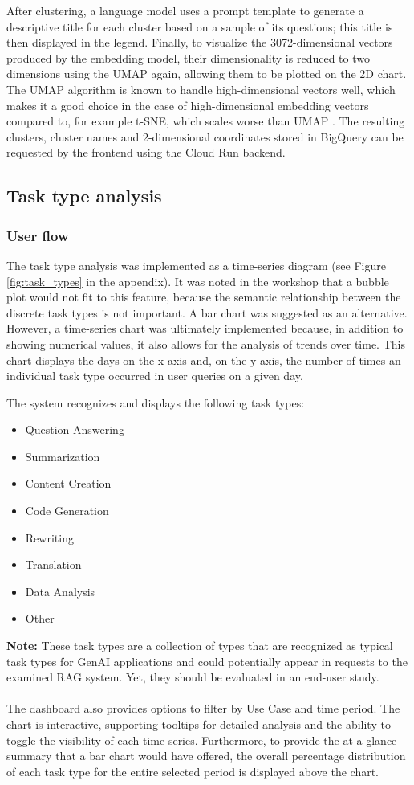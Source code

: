 \documentclass[
	english,
	ruledheaders=section,%
	class=report,%
	thesis={type=bachelor},%
	accentcolor=1b,%
	custommargins=true,%
	marginpar=false,%
	parskip=half-,%
	fontsize=11pt,%
	DIV=14,
]{tudapub}
\begin{document}
After clustering, a language model uses a prompt template to generate a descriptive title for each cluster based on a sample of its questions; this title is then displayed in the legend. Finally, to visualize the 3072-dimensional vectors produced by the embedding model, their dimensionality is reduced to two dimensions using the UMAP again, allowing them to be plotted on the 2D chart. The UMAP algorithm is known to handle high-dimensional vectors well, which makes it a good choice in the case of high-dimensional embedding vectors compared to, for example t-SNE, which scales worse than UMAP \parencite[pp.~51]{McInnes2020}.
The resulting clusters, cluster names and 2-dimensional coordinates stored in BigQuery can be requested by the frontend using the Cloud Run backend.
\subsection{Task type analysis}
\subsubsection{User flow}
The task type analysis was implemented as a time-series diagram (see Figure \ref{fig:task_types} in the appendix). It was noted in the workshop that a bubble plot would not fit to this feature, because the semantic relationship between the discrete task types is not important. A bar chart was suggested as an alternative. However, a time-series chart was ultimately implemented because, in addition to showing numerical values, it also allows for the analysis of trends over time. This chart displays the days on the x-axis and, on the y-axis, the number of times an individual task type occurred in user queries on a given day.

The system recognizes and displays the following task types:
\begin{itemize}
    \item Question Answering
    \item Summarization
    \item Content Creation
    \item Code Generation
    \item Rewriting
    \item Translation
    \item Data Analysis
    \item Other
\end{itemize}
\textbf{Note:} These task types are a collection of types that are recognized as typical task types for GenAI applications and could potentially appear in requests to the examined RAG system. Yet, they should be evaluated in an end-user study.\\
\\
The dashboard also provides options to filter by Use Case and time period. The chart is interactive, supporting tooltips for detailed analysis and the ability to toggle the visibility of each time series. Furthermore, to provide the at-a-glance summary that a bar chart would have offered, the overall percentage distribution of each task type for the entire selected period is displayed above the chart.
\end{document}
